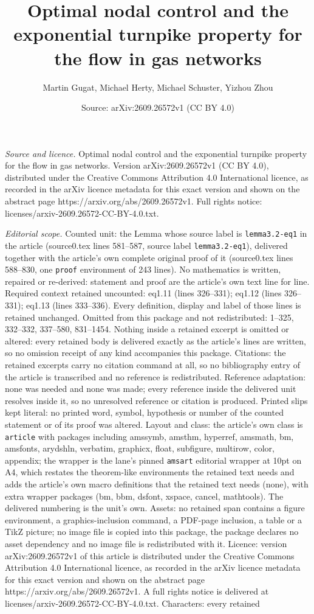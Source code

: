 \documentclass[10pt,a4paper]{amsart}
\title[Optimal nodal control and the exponential turnpike property ]{Optimal nodal control and the exponential turnpike property for the flow in gas networks}
\author{Martin Gugat, Michael Herty, Michael Schuster, Yizhou Zhou}
\date{Source: arXiv:2609.26572v1 (CC BY 4.0)}
\begin{document}
\maketitle

\noindent\emph{Source and licence.} Optimal nodal control and the exponential turnpike property for the flow in gas networks. Version arXiv:2609.26572v1 (CC BY 4.0), distributed under the Creative Commons Attribution 4.0 International licence, as recorded in the arXiv licence metadata for this exact version and shown on the abstract page https://arxiv.org/abs/2609.26572v1. Full rights notice: licenses/arxiv-2609.26572-CC-BY-4.0.txt.\par\smallskip

\noindent\textit{Editorial scope.} Counted unit: the Lemma whose source label is \texttt{lemma3.2-eq1} in the article (source0.tex lines 581--587, source label \texttt{lemma3.2-eq1}), delivered together with the article's own complete original proof of it (source0.tex lines 588--830, one \texttt{proof} environment of 243 lines). No mathematics is written, repaired or re-derived: statement and proof are the article's own text line for line. Required context retained uncounted: eq1.11 (lines 326--331); eq1.12 (lines 326--331); eq1.13 (lines 333--336). Every definition, display and label of those lines is retained unchanged. Omitted from this package and not redistributed: 1--325, 332--332, 337--580, 831--1454. Nothing inside a retained excerpt is omitted or altered: every retained body is delivered exactly as the article's lines are written, so no omission receipt of any kind accompanies this package. Citations: the retained excerpts carry no citation command at all, so no bibliography entry of the article is transcribed and no reference is redistributed. Reference adaptation: none was needed and none was made; every reference inside the delivered unit resolves inside it, so no unresolved reference or citation is produced. Printed slips kept literal: no printed word, symbol, hypothesis or number of the counted statement or of its proof was altered. Layout and class: the article's own class is \texttt{article} with packages including amssymb, amsthm, hyperref, amsmath, bm, amsfonts, arydshln, verbatim, graphicx, float, subfigure, multirow, color, appendix; the wrapper is the lane's pinned \texttt{amsart} editorial wrapper at 10pt on A4, which restates the theorem-like environments the retained text needs and adds the article's own macro definitions that the retained text needs (none), with extra wrapper packages (bm, bbm, dsfont, xspace, cancel, mathtools). The delivered numbering is the unit's own. Assets: no retained span contains a figure environment, a graphics-inclusion command, a PDF-page inclusion, a table or a TikZ picture; no image file is copied into this package, the package declares no asset dependency and no image file is redistributed with it. Licence: version arXiv:2609.26572v1 of this article is distributed under the Creative Commons Attribution 4.0 International licence, as recorded in the arXiv licence metadata for this exact version and shown on the abstract page https://arxiv.org/abs/2609.26572v1. A full rights notice is delivered at licenses/arxiv-2609.26572-CC-BY-4.0.txt. Characters: every retained 
\end{document}
